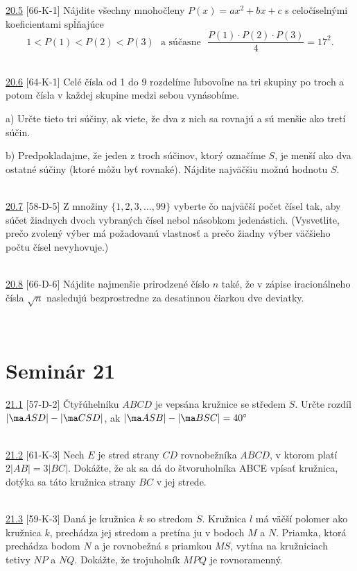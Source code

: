 \noindent \ul{20.5} [66-K-1] Nájdite všechny mnohočleny $P(x) = ax^2 +bx+c$ s celočíselnými koeficientami spĺňajúce
$$1 < P(1) < P(2) < P(3) \ \ \ \text{a súčasne} \ \  \
\frac{P(1) \cdot P(2) \cdot P(3)}{4}= 17^2.$$


\\

\noindent \ul{20.6} [64-K-1]
Celé čísla od 1 do 9 rozdelíme ľubovoľne na tri skupiny po troch a potom čísla v každej skupine medzi sebou vynásobíme.

a) Určte tieto tri súčiny, ak viete, že dva z nich sa rovnajú a sú menšie ako tretí súčin.

b) Predpokladajme, že jeden z troch súčinov, ktorý označíme $S$, je menší ako dva ostatné súčiny (ktoré môžu byť rovnaké). Nájdite najväčšiu možnú hodnotu $S$.


\\

\noindent \ul{20.7} [58-D-5] Z množiny $\{1, 2, 3, \ldots, 99\}$ vyberte čo najväčší počet čísel tak, aby súčet žiadnych dvoch vybraných čísel nebol násobkom jedenástich. (Vysvetlite, prečo zvolený výber má požadovanú vlastnosť a prečo žiadny výber väčšieho počtu čísel nevyhovuje.)


\\

\noindent \ul{20.8} [66-D-6]
Nájdite najmenšie prirodzené číslo $n$ také, že v zápise iracionálneho čísla $\sqrt{n}$ nasledujú bezprostredne za desatinnou čiarkou dve deviatky.


\\

\section*{Seminár 21}

\noindent \ul{21.1} [57-D-2] Čtyřúhelníku $ABCD$ je vepsána kružnice se středem $S$. Určte rozdíl
$|\ma ASD|- |\ma CSD|$, ak $|\ma ASB| - |\ma BSC| = 40^\circ$


\\

\noindent \ul{21.2} [61-K-3] Nech $E$ je stred strany $CD$ rovnobežníka $ABCD$, v ktorom platí $2|AB| = 3|BC|$. Dokážte, že ak sa dá do štvoruholníka ABCE vpísať kružnica, dotýka sa táto kružnica strany $BC$ v jej strede.


\\

\noindent \ul{21.3} [59-K-3]  Daná je kružnica $k$ so stredom $S$. Kružnica $l$ má väčší polomer ako kružnica $k$, prechádza jej stredom a pretína ju v bodoch $M$ a $N$. Priamka, ktorá prechádza bodom $N$ a je rovnobežná s priamkou $MS$, vytína na kružniciach tetivy $NP$ a $NQ$. Dokážte, že trojuholník $MPQ$ je rovnoramenný.


